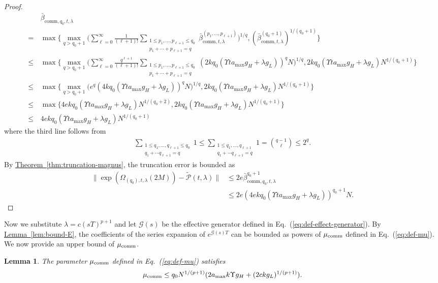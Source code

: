 \documentclass[11pt]{article}
\newtheorem{lemma}{Lemma}
\newcommand{\eq}[1]{(\ref{eq:#1})}
\newcommand{\thm}[1]{\hyperref[thm:#1]{Theorem~\ref*{thm:#1}}}
\newcommand{\lem}[1]{\hyperref[lem:#1]{Lemma~\ref*{lem:#1}}}
\newcommand{\G}{\mathcal{G}}
\renewcommand{\comm}{\mathrm{comm}}
\newcommand{\mc}{\mathcal}
\begin{document}
\begin{proof}
\begin{align*}
    &\bar{\beta}_{\comm,q_0,t,\lambda}  \\
    =\,&\max\Biggl\{\max_{q>q_0+1}\Biggl(\sum_{\ell=0}^{\infty}\frac{1}{(\ell+1)!}\sum_{\substack{1\le p_1, \ldots, p_{\ell+1}\le q_0\\p_1+\cdots+p_{\ell+1}=q}}\bar{\beta}_{\comm, t,\lambda}^{(p_1, \ldots, p_{\ell+1})}\Biggr)^{1/q}, (\bar{\beta}_{\comm, t,\lambda}^{(q_0+1)})^{1/(q_0+1)}\Biggr\}\\
    \le \,&\max\Biggl\{\max_{q>q_0+1}\Biggl(\sum_{\ell=0}^{\infty}\frac{q^{\ell+1}}{(\ell+1)!}\sum_{\substack{1\le p_1, \ldots, p_{\ell+1}\le q_0\\p_1+\cdots+p_{\ell+1}=q}}(2kq_0(\Upsilon t a_{\max}g_H+\lambda g_L))^{q}N\Biggr)^{1/q}, 2kq_0(\Upsilon t a_{\max}g_H+\lambda g_L)N^{1/(q_0+1)} \Biggr\}\\
    \le \,& \max\Big\{\max_{q>q_0+1}\bigl(e^q(4kq_0(\Upsilon t a_{\max}g_H+\lambda g_L))^{q}N\bigr)^{1/q}, 2kq_0(\Upsilon t a_{\max}g_H+\lambda g_L)N^{1/(q_0+1)}\Big\}\\
    \le \,& \max\Big\{4ekq_0(\Upsilon t a_{\max}g_H+\lambda g_L) N^{1/(q_0+2)}, 2kq_0(\Upsilon t a_{\max}g_H+\lambda g_L)N^{1/(q_0+1)}\Big\} \\
    \le \, &4ekq_0(\Upsilon t a_{\max}g_H+\lambda g_L) N^{1/(q_0+1)}
\end{align*}
where the third line follows from \begin{align*}
    \sum_{\substack{1\le q_1, \ldots, q_{\ell+1}\le q_0\\q_1+\cdots q_{\ell+1}=q}}1\le  \sum_{\substack{1\le q_1, \ldots, q_{\ell+1}\\q_1+\cdots q_{\ell+1}=q}}1=\binom{q-1}{\ell}\le 2^q.
\end{align*}
By \thm{truncation-magnus}, the truncation error is bounded as 
\begin{align*}
\|\exp(\Omega_{(q_0), t,\lambda}(2M))-\tilde{\mc P}(t,\lambda)\|
&\le  2e\bar{\beta}_{\comm,q_0,t,\lambda}^{q_0+1}\\
&\le 2e (4ekq_0(\Upsilon t a_{\max}g_H+\lambda g_L))^{q_0+1}N.
\end{align*}
\end{proof}
Now we substitute $\lambda = c (sT)^{p+1}$ and let $\G(s)$ be the effective generator defined in Eq.~\eq{def-effect-generator}. By \lem{bound-E}, the coefficients of the series expansion of $e^{\G(s)T}$ can be bounded as powers of $\mu_{\rm comm}$ defined in Eq.~\eq{def-mu}. We now provide an upper bound of $\mu_{\rm comm}$. 
\begin{lemma}
\label{lem:bound-mu}
    The parameter $\mu_{\rm comm}$ defined in Eq.~\eq{def-mu} satisfies \begin{align*}
        \mu_{\rm comm} \le q_0 N^{1/(p+1)}(2a_{\max}k \Upsilon g_H+ (2ckg_L)^{1/(p+1)}).
    \end{align*}
\end{lemma}
\end{document}
